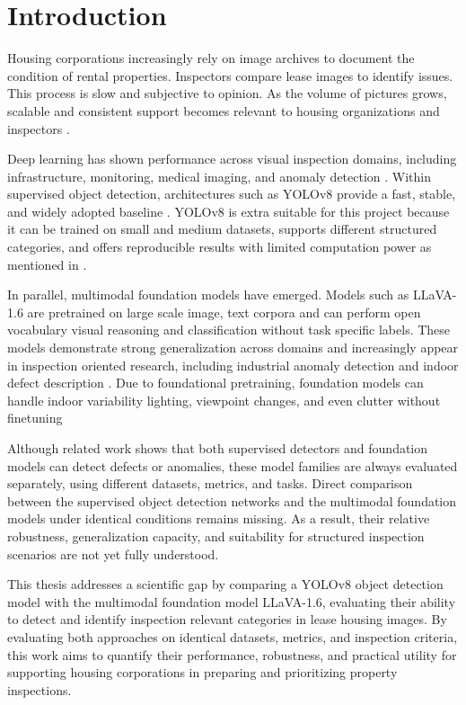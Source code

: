 \section{Introduction}
\label{sec:introduction}
Housing corporations increasingly rely on image archives to document the condition of rental properties. Inspectors compare lease images to identify issues. This process is slow and subjective to opinion. As the volume of pictures grows, scalable and consistent support becomes relevant to housing organizations and inspectors \cite{kang_improvement_2025}. 

Deep learning has shown performance across visual inspection domains, including infrastructure, monitoring, medical imaging, and anomaly detection \cite{cheng_change_2024}. Within supervised object detection, architectures such as YOLOv8 provide a fast, stable, and widely adopted baseline \cite{jocher_ultralytics_2023}. YOLOv8 is extra suitable for this project because it can be trained on small and medium datasets, supports different structured categories, and offers reproducible results with limited computation power as mentioned in \cite{goncalves_deep_2023}.

In parallel, multimodal foundation models have emerged. Models such as LLaVA-1.6 are pretrained on large scale image, text corpora and can perform open vocabulary visual reasoning and classification without task specific labels. These models demonstrate strong generalization across domains and increasingly appear in inspection oriented research, including industrial anomaly detection and indoor defect description \cite{jiang_mmad_2025, wen_autonomous_2024}. Due to foundational pretraining,  foundation models can handle indoor variability lighting, viewpoint changes, and even clutter without finetuning 

Although related work shows that both supervised detectors and foundation models can detect defects or anomalies, these model families are always evaluated separately, using different datasets, metrics, and tasks. Direct comparison between the supervised object detection networks and the multimodal foundation models under identical conditions remains missing. As a result, their relative robustness, generalization capacity, and suitability for structured inspection scenarios are not yet fully understood.

This thesis addresses a scientific gap by comparing a YOLOv8 object detection model with the multimodal foundation model LLaVA-1.6, evaluating their ability to detect and identify  inspection relevant categories in lease housing images. By evaluating both approaches on identical datasets, metrics, and inspection criteria, this work aims to quantify their performance, robustness, and practical utility for supporting housing corporations in preparing and prioritizing property inspections.

